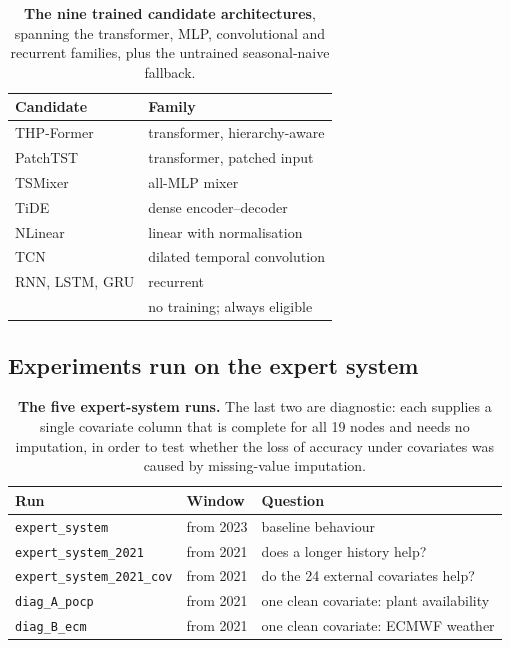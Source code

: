 \begin{table}[htp]
\centering
\begin{tabular}{ll}
\toprule
{\bf Candidate} & {\bf Family} \\
\midrule
THP-Former & transformer, hierarchy-aware \\
PatchTST & transformer, patched input \\
TSMixer & all-MLP mixer \\
TiDE & dense encoder--decoder \\
NLinear & linear with normalisation \\
TCN & dilated temporal convolution \\
RNN, LSTM, GRU & recurrent \\
\midrule
\naiveA{} & no training; always eligible \\
\bottomrule
\end{tabular}
\caption[Candidate architectures]{\textbf{The nine trained candidate architectures},
spanning the transformer, MLP, convolutional and recurrent families, plus the untrained
seasonal-naive fallback.}
\label{tab:candidates}
\end{table}

\subsection{Experiments run on the expert system}

\begin{table}[htp]
\centering
\begin{tabular}{llp{6.1cm}}
\toprule
{\bf Run} & {\bf Window} & {\bf Question} \\
\midrule
\verb+expert_system+ & from 2023 & baseline behaviour \\
\verb+expert_system_2021+ & from 2021 & does a longer history help? \\
\verb+expert_system_2021_cov+ & from 2021 & do the 24 external covariates help? \\
\verb+diag_A_pocp+ & from 2021 & one clean covariate: plant availability \\
\verb+diag_B_ecm+ & from 2021 & one clean covariate: ECMWF weather \\
\bottomrule
\end{tabular}
\caption[Expert-system runs]{\textbf{The five expert-system runs.} The last two are
diagnostic: each supplies a single covariate column that is complete for all 19 nodes and
needs no imputation, in order to test whether the loss of accuracy under covariates was
caused by missing-value imputation.}
\label{tab:es-runs}
\end{table}

